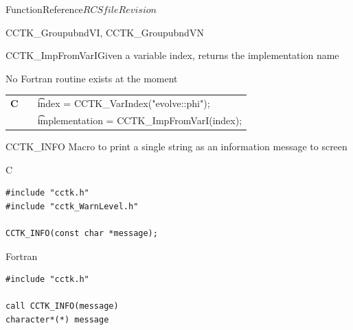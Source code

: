 \begin{cactuspart}{FunctionReference}{$RCSfile$}{$Revision$}
\begin{FunctionDescription}{CCTK\_GroupubndVI, CCTK\_GroupubndVN}
\end{FunctionDescription}





\begin{CCTKFunc}{CCTK\_ImpFromVarI}{Given a variable index, returns the implementation name}
\label{CCTK-ImpFromVarI}
\showcargs
\begin{params}
\end{params}
\begin{discussion}
No Fortran routine exists at the moment
\end{discussion}
\begin{examples}
\begin{tabular}{@{}p{3cm}cp{11cm}}
\hfill {\bf C} && {\t index = CCTK\_VarIndex("evolve::phi");}\\
               &&{\t implementation = CCTK\_ImpFromVarI(index);}
\\
\end{tabular}
\end{examples}
\begin{errorcodes}
\end{errorcodes}
\end{CCTKFunc}





\begin{FunctionDescription}{CCTK\_INFO}
\label{CCTK-INFO}
Macro to print a single string as an information message to screen

\begin{SynopsisSection}
\begin{Synopsis}{C}
\begin{verbatim}
#include "cctk.h"
#include "cctk_WarnLevel.h"

CCTK_INFO(const char *message);
\end{verbatim}
\end{Synopsis}
\begin{Synopsis}{Fortran}
\begin{verbatim}
#include "cctk.h"

call CCTK_INFO(message)
character*(*) message
\end{verbatim}
\end{Synopsis}
\end{SynopsisSection}


\end{FunctionDescription}
\end{cactuspart}
